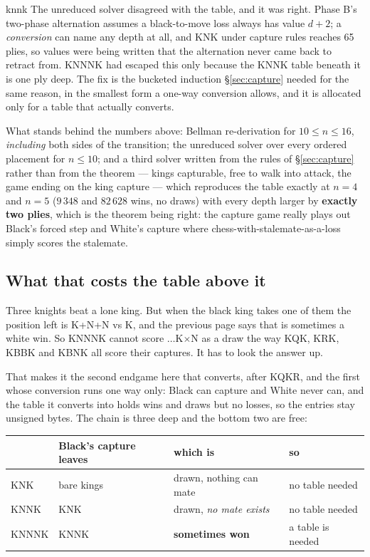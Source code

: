 \documentclass[11pt]{article}
\begin{document}
\begin{result}[title={How this one was checked, and what it caught}]{knnk}
The unreduced solver disagreed with the table, and it was right. Phase B's
two-phase alternation assumes a black-to-move loss always has value $d+2$; a
\emph{conversion} can name any depth at all, and KNK under capture rules
reaches 65 plies, so values were being written that the alternation never came
back to retract from. KNNNK had escaped this only because the KNNK table
beneath it is one ply deep. The fix is the bucketed induction \S\ref{sec:capture} needed for
the same reason, in the smallest form a one-way conversion allows, and it is
allocated only for a table that actually converts.

\smallskip
What stands behind the numbers above: Bellman re-derivation for
$10 \le n \le 16$, \emph{including} both sides of the transition; the unreduced
solver over every ordered placement for $n \le 10$; and a third solver written
from the rules of \S\ref{sec:capture} rather than from the theorem --- kings capturable, free to
walk into attack, the game ending on the king capture --- which reproduces the
table exactly at $n=4$ and $n=5$ ($9\,348$ and $82\,628$ wins, no draws) with
every depth larger by \textbf{exactly two plies}, which is the theorem being
right: the capture game really plays out Black's forced step and White's
capture where chess-with-stalemate-as-a-loss simply scores the stalemate.
\end{result}

\subsection{What that costs the table above it}\label{sub:kn-cost}

Three knights beat a lone king. But when the black king takes one of them the
position left is K+N+N vs K, and the previous page says that is sometimes a
white win. So KNNNK cannot score $\ldots$K$\times$N as a draw the way KQK,
KRK, KBBK and KBNK all score their captures. It has to look the answer up.

That makes it the second endgame here that converts, after KQKR, and the first
whose conversion runs one way only: Black can capture and White never can, and
the table it converts into holds wins and draws but no losses, so the entries
stay unsigned bytes. The chain is three deep and the bottom two are free:

\begin{center}\small
\begin{tabular}{@{}llll@{}}
\toprule
& \textbf{Black's capture leaves} & \textbf{which is} & \textbf{so} \\
\midrule
KNK   & bare kings & drawn, nothing can mate & no table needed \\
KNNK  & KNK        & drawn, \emph{no mate exists} & no table needed \\
KNNNK & KNNK       & \textbf{sometimes won} & a table is needed \\
\bottomrule
\end{tabular}
\end{center}
\end{document}
